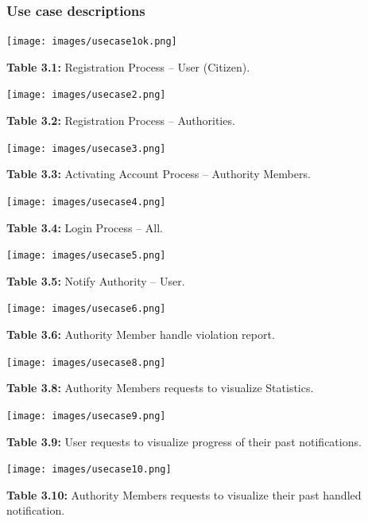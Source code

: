 \documentclass[12pt]{article}
\begin{document}
\subsubsection{Use case descriptions}
\vspace{5mm}
		 
		 \texttt{[image: images/usecase1ok.png]}                  
		 
		  \textbf{Table 3.1:} Registration Process – User (Citizen).

\newpage
	 
		 \texttt{[image: images/usecase2.png]}                  
		 
		  \textbf{Table 3.2:} Registration Process – Authorities.

\newpage

 \texttt{[image: images/usecase3.png]}                  
		 
		  \textbf{Table 3.3:} Activating Account Process – Authority Members.
		  
\newpage


 \texttt{[image: images/usecase4.png]}                  
		 
		  \textbf{Table 3.4:} Login Process – All.
		  
 \texttt{[image: images/usecase5.png]}                  
		 
		  \textbf{Table 3.5:} Notify Authority – User.
		  
\newpage

 \texttt{[image: images/usecase6.png]}                  
		 
		  \textbf{Table 3.6:} Authority Member handle violation report. 

\newpage

\begin{center}
\texttt{[image: images/usecase8.png]}                 

\textbf{Table 3.8:} Authority Members requests to visualize Statistics. 
\end{center}

\begin{center}
\texttt{[image: images/usecase9.png]}                 

\textbf{Table 3.9:} User requests to visualize progress of their past notifications. 
\end{center}

\newpage

\begin{center}
\texttt{[image: images/usecase10.png]}                 

\textbf{Table 3.10:} Authority Members requests to visualize their past handled notification.
\end{center}
\end{document}
